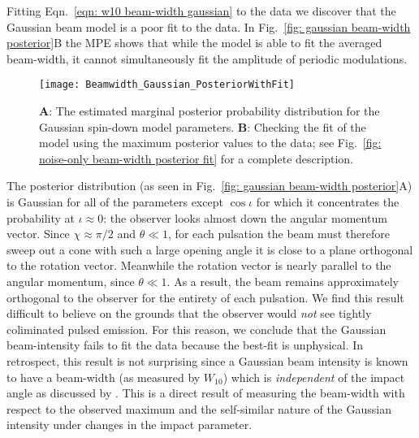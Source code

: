 \documentclass[../full_thesis/full_thesis.tex]{subfiles}
\newcommand{\bigfigurecaptions}[2]{
$\textbf{A}$: The estimated marginal posterior probability distribution for the
#1 #2 model parameters. $\textbf{B}$: Checking the fit of the model using the
maximum posterior values to the data; see Fig.~\ref{fig: noise-only beam-width
posterior fit} for a complete description.}
\begin{document}
Fitting Eqn.~\eqref{eqn: w10 beam-width gaussian} to the data we discover that
the Gaussian beam model is a poor fit to the data. In Fig.~\ref{fig: gaussian
beam-width posterior}B the MPE shows that while the model is able to fit the
averaged beam-width, it cannot simultaneously fit the amplitude of periodic
modulations.
\begin{figure*}
\centering
\texttt{[image: Beamwidth\_Gaussian\_PosteriorWithFit]}
\caption{\bigfigurecaptions{Gaussian}{spin-down}}
\label{fig: gaussian beam-width posterior}
\end{figure*}

The posterior distribution (as seen in Fig.~\ref{fig: gaussian beam-width
posterior}A) is Gaussian for all of the parameters except $\cos\iota$ for which
it concentrates the probability at $\iota\approx0$: the observer looks almost
down the angular momentum vector. Since $\chi\approx\pi/2$ and $\theta \ll 1$,
for each pulsation the beam must therefore sweep out a cone with such a large opening angle
it is close to a plane orthogonal to the rotation vector. Meanwhile the
rotation vector is nearly parallel to the angular momentum, since $\theta \ll
1$. As a result, the beam remains approximately orthogonal to the observer for
the entirety of each pulsation.  We find this result difficult to believe on
the grounds that the observer would \emph{not} see tightly coliminated pulsed
emission.  For this reason, we conclude that the Gaussian beam-intensity fails
to fit the data because the best-fit is unphysical.
In retrospect, this result is not surprising since a Gaussian beam intensity is
known to have a beam-width (as measured by $W_{10}$) which is \emph{independent} of
the impact angle as discussed by \citet{Akgun2006}. This is a direct result of
measuring the beam-width with respect to the observed maximum and the self-similar
nature of the Gaussian intensity under changes in the impact parameter.
\end{document}
